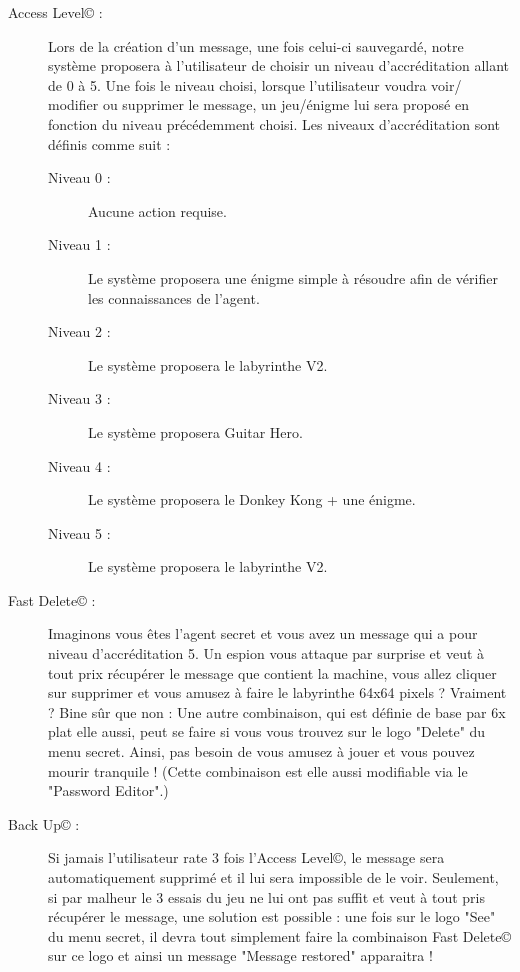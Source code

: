 \begin{description}
    \item [Access Level© :] Lors de la création d'un message, une fois celui-ci sauvegardé, notre système proposera à l'utilisateur de choisir un niveau d'accréditation allant de 0 à 5. Une fois le niveau choisi, lorsque l'utilisateur voudra voir/ modifier ou supprimer le message, un jeu/énigme lui sera proposé en fonction du niveau précédemment choisi.
    \newline
    Les niveaux d'accréditation sont définis comme suit :
\begin{description}
    \item [Niveau 0 :] Aucune action requise.
    \item [Niveau 1 :] Le système proposera une énigme simple à résoudre afin de vérifier les connaissances de l'agent.
    \item [Niveau 2 :] Le système proposera le labyrinthe V2.
    \item [Niveau 3 :] Le système proposera Guitar Hero.
    \item [Niveau 4 :] Le système proposera le Donkey Kong + une énigme.
    \item [Niveau 5 :] Le système proposera le labyrinthe V2.
\end{description}
    \item [Fast Delete© :] Imaginons vous êtes l'agent secret et vous avez un message qui a pour niveau d'accréditation 5. Un espion vous attaque par surprise et veut à tout prix récupérer le message que contient la machine, vous allez cliquer sur supprimer et vous amusez à faire le labyrinthe 64x64 pixels ? Vraiment ? Bine sûr que non : Une autre combinaison, qui est définie de base par 6x plat elle aussi, peut se faire si vous vous trouvez sur le logo "Delete" du menu secret. Ainsi, pas besoin de vous amusez à jouer et vous pouvez mourir tranquile ! (Cette combinaison est elle aussi modifiable via le "Password Editor".)
    \item [Back Up© :] Si jamais l'utilisateur rate 3 fois l'Access Level©, le message sera automatiquement supprimé et il lui sera impossible de le voir. Seulement, si par malheur le 3 essais du jeu ne lui ont pas suffit et veut à tout pris récupérer le message, une solution est possible : une fois sur le logo "See" du menu secret, il devra tout simplement faire la combinaison Fast Delete© sur ce logo et ainsi un message "Message restored" apparaitra !
\end{description}
\newpage

